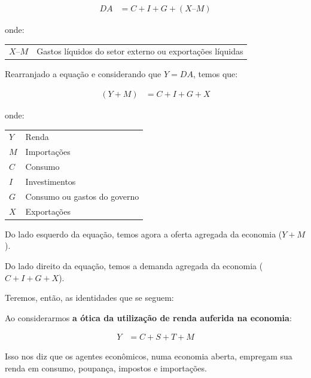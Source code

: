 \documentclass{article}\usepackage[]{graphicx}\usepackage[]{xcolor}
\makeatletter
\newenvironment{conditions}
  {\par\vspace{\abovedisplayskip}\noindent\begin{tabular}{>{$}l<{$} @{${}={}$} l}}
  {\end{tabular}\par\vspace{\belowdisplayskip}}
\makeatother
\begin{document}
\begin{equation}\label{eq14}
\begin{split}
    DA    &=    C + I + G + (X – M)
\end{split}
\end{equation}

onde:

\begin{conditions}
X – M   &   Gastos líquidos do setor externo ou exportações líquidas
\end{conditions}

Rearranjado a equação e considerando que \(Y = DA\), temos que:

\begin{equation}\label{eq15}
\begin{split}
    (Y + M) &= C + I + G + X
\end{split}
\end{equation}

onde:

\begin{conditions}
Y   &   Renda\\
M   &   Importações\\
C   &   Consumo\\
I   &   Investimentos\\
G   &   Consumo ou gastos do governo\\
X   &   Exportações\\
\end{conditions}

Do lado esquerdo da equação, temos agora a oferta agregada da economia (\(Y + M\)).\par

Do lado direito da equação, temos a demanda agregada da economia (\(C + I + G + X\)).\par

Teremos, então, as identidades que se seguem:\par

Ao considerarmos \textbf{a ótica da utilização de renda auferida na economia}:

\begin{equation}\label{eq16}
\begin{split}
    Y &= C + S + T + M
\end{split}
\end{equation}

Isso nos diz que os agentes econômicos, numa economia aberta, empregam sua renda em consumo,
poupança, impostos e importações.\par
\end{document}
